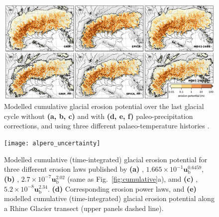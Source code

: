 \documentclass[utf8]{article}
\begin{document}
    \begin{figure}
      \centerline{\includegraphics{alpero_sensitivity}}
      \caption{%
        Modelled cumulative glacial erosion potential over the last glacial
        cycle without \textbf{(a, b, c)} and with \textbf{(d, e, f)}
        paleo-precipitation corrections, and using three different
        palaeo-temperature histories \citep[see][]{Seguinot.etal.2018}.}
      \label{fig:sensitivity}
    \end{figure}

    \begin{figure}
      \centerline{\texttt{[image: alpero\_uncertainty]}}
      \caption{%
        Modelled cumulative (time-integrated) glacial erosion potential for
        three different erosion laws published by
        \textbf{(a)} \citet{Cook.etal.2020},
          $1.665 \times 10^{-1} \textbf{u}_\mathrm{b} ^{0.6459}$,
        \textbf{(b)} \citet{Herman.etal.2015},
          $2.7 \times 10^{-7} \textbf{u}_\mathrm{b} ^{2.02}$
          (same as Fig.~\ref{fig:cumulative}a), amd
        \textbf{(c)} \citet{Koppes.etal.2015},
          $5.2 \times 10^{-8} \textbf{u}_\mathrm{b} ^{2.34}$.
        \textbf{(d)} Corresponding erosion power laws, and
        \textbf{(e)} modelled cumulative (time-integrated) glacial erosion
          potential along a Rhine Glacier transect (upper panels dashed line).}
      \label{fig:uncertainty}
    \end{figure}



\end{document}
